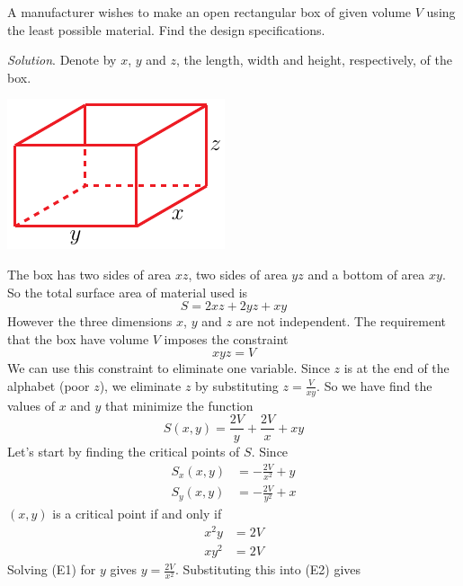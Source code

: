 \begin{eg}\label{eg max min B}
A manufacturer wishes to make an open rectangular box of given volume $V$
using the least possible material. Find the design specifications.

\medskip
\noindent\textit{Solution}.
Denote by $x$, $y$ and $z$, the length, width and height, respectively,
of the box.
\begin{efig}
\begin{center}
   \includegraphics{box.pdf}
\end{center}
\end{efig}
The box has two sides of area $xz$, two sides of area $yz$ and a bottom
of area $xy$. So the total surface area of material used is
\begin{equation*}
S = 2xz + 2yz + xy
\end{equation*}
However the three dimensions $x$, $y$ and $z$ are not independent. The
requirement that the box have volume $V$ imposes the constraint
\begin{equation*}
xyz = V
\end{equation*}
We can use this constraint to eliminate one variable. Since $z$
is at the end of the alphabet (poor $z$), we eliminate $z$
by substituting $z=\frac{V}{xy}$. So we have find the values of $x$ and 
$y$ that minimize the function 
\begin{equation*}
S(x,y) = \frac{2V}{y} + \frac{2V}{x} + xy
\end{equation*}
Let's start by finding the critical points of $S$. Since
\begin{align*}
S_x(x,y) &= -\frac{2V}{x^2} + y \\[0.1in]
S_y(x,y) &= -\frac{2V}{y^2} + x
\end{align*}
$(x,y)$ is a critical point if and only if
\begin{align*}
x^2y&=2V \tag{E1} \\
xy^2&=2V \tag{E2}
\end{align*}
Solving (E1) for $y$ gives $y=\frac{2V}{x^2}$. Substituting this into
(E2) gives
\begin{equation*}

\end{equation*}
\end{eg}
